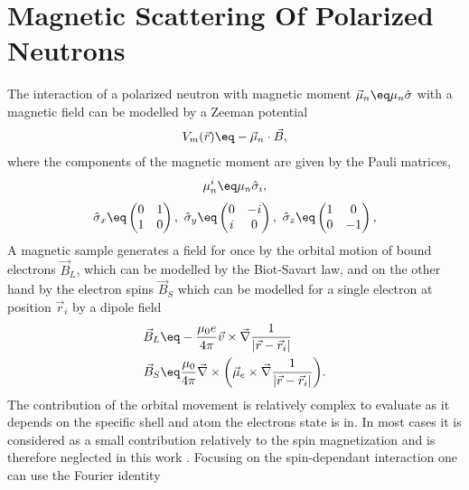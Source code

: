 \documentclass[\main/dresen_thesis.tex]{subfiles}
\begin{document}
  \section{Magnetic Scattering Of Polarized Neutrons}
    \label{ch:appendix:calculations:magneticScatteringTheory}
    The interaction of a polarized neutron with magnetic moment $\vec{\mu}_n \eq \mu_n \hat{\sigma}$ with a magnetic field can be modelled by a Zeeman potential
    \begin{align}
      V_m (\vec{r}) \eq - \vec{\mu}_n \cdot \vec{B},
    \end{align}
    where the components of the magnetic moment are given by the Pauli matrices,
    \begin{align}
      \mu_n^i \eq \mu_n \hat{\sigma}_i,
    \end{align}
    \begin{align}
      \hat{\sigma}_x \eq \begin{pmatrix} 0 & 1 \\1 & 0 \end{pmatrix},\,\,
      \hat{\sigma}_y \eq \begin{pmatrix} 0 & -i \\i & 0 \end{pmatrix},\,\,
      \hat{\sigma}_z \eq \begin{pmatrix} 1 & 0 \\0 & -1 \end{pmatrix},
    \end{align}
    A magnetic sample generates a field for once by the orbital motion of bound electrons $\vec{B}_L$, which can be modelled by the Biot-Savart law, and on the other hand by the electron spins $\vec{B}_S$ which can be modelled for a single electron at position $\vec{r}_i$ by a dipole field
    \begin{align}
      \vec{B}_L \eq& -\frac{\mu_0 e}{4 \pi} \vec{v} \times \vec{\nabla} \frac{ 1}{|\vec{r} - \vec{r}_i|}\\
      \vec{B}_S \eq& \frac{\mu_0}{4\pi} \vec{\nabla} \times \biggl(\vec{\mu}_e \times \vec{\nabla} \frac{ 1}{|\vec{r} - \vec{r}_i|} \biggr).
    \end{align}
    The contribution of the orbital movement is relatively complex to evaluate as it depends on the specific shell and atom the electrons state is in.
    In most cases it is considered as a small contribution relatively to the spin magnetization and is therefore neglected in this work \cite{Zhu_2005_Moder}.
    Focusing on the spin-dependant interaction one can use the Fourier identity
\end{document}
